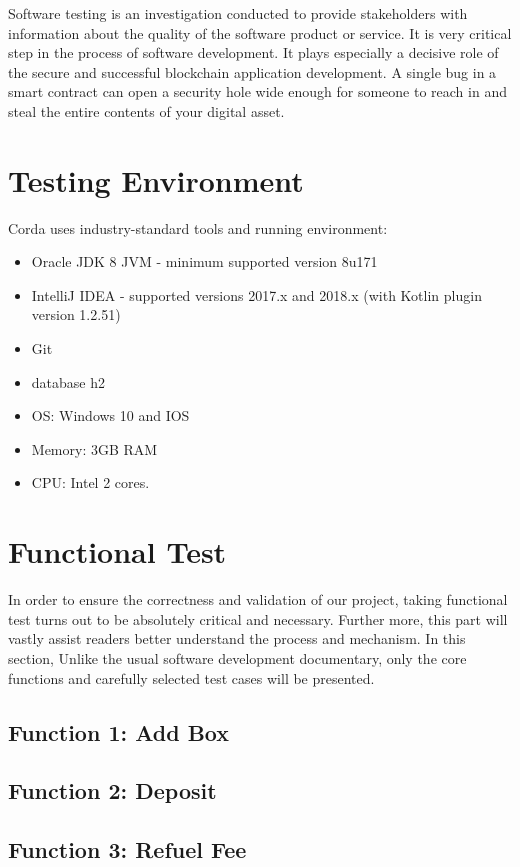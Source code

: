 Software testing is an investigation conducted to provide stakeholders with information about the quality of the software product or service. It is very critical step in the process of software development. It plays especially a decisive role of the secure and successful blockchain application development. A single bug in a smart contract can open a security hole wide enough for someone to reach in and steal the entire contents of your digital asset.
\section{Testing Environment}
Corda uses industry-standard tools and running environment:
\begin{itemize}
	\item Oracle JDK 8 JVM - minimum supported version 8u171
	\item IntelliJ IDEA - supported versions 2017.x and 2018.x (with Kotlin plugin version 1.2.51)
	\item Git
	\item database h2
	\item OS: Windows 10 and IOS
	\item Memory: 3GB RAM
	\item CPU: Intel 2 cores.
	
\end{itemize}

\section{Functional Test}
In order to ensure the correctness and validation of our project, taking functional test turns out to be absolutely critical and necessary. Further more, this part will vastly assist readers better understand the process and mechanism. In this section, Unlike the usual software development documentary, only the core functions  and carefully selected test cases will be presented. 

\subsection{Function 1: Add Box}


\subsection{Function 2: Deposit}

\subsection{Function 3: Refuel Fee}

